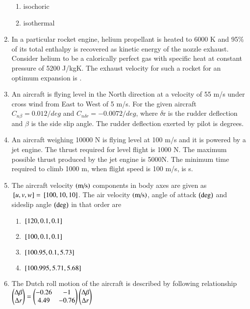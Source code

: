 \documentclass[journal]{IEEEtran}
\numberwithin{equation}{enumi}
\numberwithin{figure}{enumi}
\begin{document}
\begin{enumerate}
\begin{enumerate}
\item isochoric
\item isothermal
\end{enumerate}
\item In a particular rocket engine, helium propellant is heated to 6000 K and 95\% of its total enthalpy is recovered as kinetic energy of the nozzle exhaust. Consider helium to be a calorically perfect gas with specific heat at constant pressure of 5200 J/kgK. The exhaust velocity for such a rocket for an optimum expansion is \underline{\hspace{1cm}}.
\item An aircraft is flying level in the North direction at a velocity of 55 m/s under cross wind from East to West of 5 m/s. For the given aircraft $C_{n\beta} = 0.012/deg$ and $C_{n\delta r} = -0.0072/deg$, where $\delta$r is the rudder deflection and $\beta$ is the side slip angle. The rudder deflection exerted by pilot is \underline{\hspace{1cm}} degrees.
\item An aircraft weighing 10000 N is flying level at 100 m/s and it is powered by a jet engine. The thrust required for level flight is 1000 N. The maximum possible thrust produced by the jet engine is 5000N. The minimum time required to climb 1000 m, when flight speed is 100 m/s, is \underline{\hspace{1cm}} s.
\item The aircraft velocity $\left(\text{m/s}\right)$ components in body axes are given as ${}\left[u, v, w\right] = {}\left[100, 10, 10\right]$. The air velocity $\left(\text{m/s}\right)$, angle of attack $\left(\text{deg}\right)$ and sideslip angle $\left(\text{deg}\right)$ in that order are
\begin{enumerate}
\item ${}\left[120, 0.1, 0.1\right]$
\item ${}\left[100, 0.1, 0.1\right]$
\item ${}\left[100.95, 0.1, 5.73\right]$
\item ${}\left[100.995, 5.71, 5.68\right]$
\end{enumerate}
\item The Dutch roll motion of the aircraft is described by following relationship \\
$\begin{pmatrix}\Delta\beta \\
        \Delta r\end{pmatrix} = \begin{pmatrix}-0.26 & -1 \\
	                   4.49 & -0.76\end{pmatrix}\begin{pmatrix}\Delta\beta \\
			                       \Delta r\end{pmatrix}$ \\

\end{enumerate}
\end{document}
